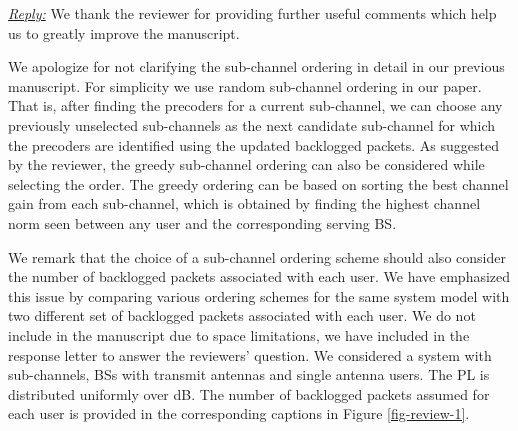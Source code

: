 
\vspace{1eM}
\underline{\textit{Reply:}} We thank the reviewer for providing further useful comments which help us to greatly improve the manuscript.

\begin{enumerate}
	
	 
	
	\resp We apologize for not clarifying the sub-channel ordering in detail in our previous manuscript. For simplicity we use random sub-channel ordering in our paper. That is, after finding the precoders for a current sub-channel, we can choose any previously unselected sub-channels as the next candidate sub-channel for which the precoders are identified using the updated backlogged packets. As suggested by the reviewer, the greedy sub-channel ordering can also be considered while selecting the order. The greedy ordering can be based on sorting the best channel gain from each sub-channel, which is obtained by finding the highest channel norm seen between any user and the corresponding serving \ac{BS}.  
	
	We remark that the choice of a sub-channel ordering scheme should also consider the number of backlogged packets associated with each user. We have emphasized this issue by comparing various ordering schemes for the same system model with two different set of backlogged packets associated with each user. We do not include in the manuscript due to space limitations, we have included in the response letter to answer the reviewers' question. We considered a system with  sub-channels,  \acp{BS} with  transmit antennas and  single antenna users. The \ac{PL} is distributed uniformly over \eqn{[0,-3]} dB. The number of backlogged packets assumed for each user is provided in the corresponding captions in Figure \ref{fig-review-1}.
	\begin{figure*}[h!]
		\centering
		\hfill
		\caption{Convergence of the algorithms for  using  norm}
		\label{fig-review-1}
	\end{figure*}
	

\end{enumerate}
